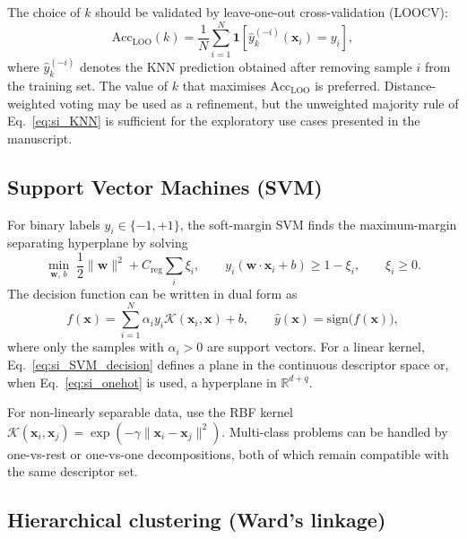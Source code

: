 \documentclass[journal=aamick,manuscript=article]{achemso}
\begin{document}
The choice of $k$ should be validated by leave-one-out
cross-validation (LOOCV):
\begin{equation}
	\mathrm{Acc}_{\mathrm{LOO}}(k)
	=
	\frac{1}{N}
	\sum_{i=1}^{N}
	\mathbf{1}\!\left[
	\hat{y}^{(-i)}_k(\mathbf{x}_i) = y_i
	\right],
	\label{eq:si_KNN_LOO}
\end{equation}
where $\hat{y}^{(-i)}_k$ denotes the KNN prediction obtained after
removing sample $i$ from the training set. The value of $k$ that
maximises $\mathrm{Acc}_{\mathrm{LOO}}$ is preferred. Distance-weighted
voting may be used as a refinement, but the unweighted majority rule of
Eq.~\eqref{eq:si_KNN} is sufficient for the exploratory use cases
presented in the manuscript.

\subsection{Support Vector Machines (SVM)}
\label{sec:si_SVM}

For binary labels $y_i \in \{-1,+1\}$, the soft-margin SVM finds the
maximum-margin separating hyperplane by solving
\begin{equation}
	\min_{\mathbf{w},\,b}\;
	\frac{1}{2}\|\mathbf{w}\|^2
	+ C_{\mathrm{reg}}\sum_{i}\xi_i,
	\qquad
	y_i(\mathbf{w}\cdot\mathbf{x}_i + b) \ge 1 - \xi_i,
	\qquad
	\xi_i \ge 0.
	\label{eq:si_SVM}
\end{equation}
The decision function can be written in dual form as
\begin{equation}
	f(\mathbf{x})
	=
	\sum_{i=1}^{N}
	\alpha_i y_i \mathcal{K}(\mathbf{x}_i,\mathbf{x})
	+ b,
	\qquad
	\hat{y}(\mathbf{x}) = \mathrm{sign}\!\bigl(f(\mathbf{x})\bigr),
	\label{eq:si_SVM_decision}
\end{equation}
where only the samples with $\alpha_i > 0$ are support vectors. For a
linear kernel, Eq.~\eqref{eq:si_SVM_decision} defines a plane in the
continuous descriptor space or, when Eq.~\eqref{eq:si_onehot} is used, a
hyperplane in $\mathbb{R}^{d+q}$.

For non-linearly separable data, use the RBF kernel
$\mathcal{K}(\mathbf{x}_i, \mathbf{x}_j)
= \exp(-\gamma\|\mathbf{x}_i - \mathbf{x}_j\|^2)$.
Multi-class problems can be handled by one-vs-rest or one-vs-one
decompositions, both of which remain compatible with the same
descriptor set.

\subsection{Hierarchical clustering (Ward's linkage)}
\label{sec:si_Ward}
\end{document}
